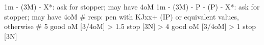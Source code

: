 1m - (3M) - X*: ask for stopper; may have 4oM
1m - (3M) - P - (P) - X*: ask for stopper; may have 4oM
# resp: pen with KJxx+ (IP) or equivalent values, otherwise
# 5 good oM [3/4oM] > 1.5 stop [3N] > 4 good oM [3/4oM] > 1 stop [3N]
